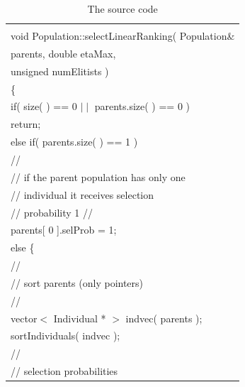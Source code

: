 \documentclass[twocolumn]{article}
\begin{document}
\begin{table}[h]
\begin{center}
\caption{The source code}
\label{SC4}
{\scriptsize
\begin{tabular}{|l|}\hline
\hspace*{7cm}\\
void Population::selectLinearRanking( Population\& \\
\hspace*{4mm} parents, double etaMax,\\
\hspace*{4mm} unsigned numElitists )\\
\{\\
\hspace*{4mm} if( size( ) == 0 $\mid \mid$ parents.size( ) == 0 )\\
\hspace*{8mm} return;\\
\hspace*{4mm} else if( parents.size( ) == 1 )\\
\hspace*{8mm} //\\
\hspace*{8mm} // if the parent population has only one \\
\hspace*{8mm} // individual it receives selection \\
\hspace*{8mm} // probability 1
\hspace*{8mm} //\\
\hspace*{8mm} parents[ 0 ].selProb = 1;\\
\hspace*{4mm} else \{\\
\hspace*{8mm} //\\
\hspace*{8mm} // sort parents (only pointers)\\
\hspace*{8mm} //\\
\hspace*{8mm} vector$<$ Individual * $>$ indvec( parents );\\
\hspace*{8mm} sortIndividuals( indvec );\\
\hspace*{8mm} //\\
\hspace*{8mm} // selection probabilities\\

\end{tabular}}
\end{center}
\end{table}
\end{document}
